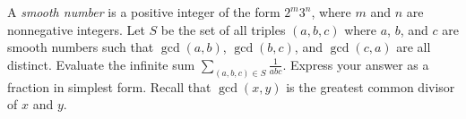 A \emph{smooth number} is a positive integer of the form $2^m3^n$, where $m$ and $n$ are nonnegative integers. Let $S$ be the set of all triples $\left(a,b,c\right)$ where $a$, $b$, and $c$ are smooth numbers such that $\gcd\left(a,b\right)$, $\gcd\left(b,c\right)$, and $\gcd\left(c,a\right)$ are all distinct. Evaluate the infinite sum $\sum_{\left(a,b,c\right)\in S}\frac{1}{abc}$. Express your answer as a fraction in simplest form. Recall that $\gcd\left(x,y\right)$ is the greatest common divisor of $x$ and $y$.